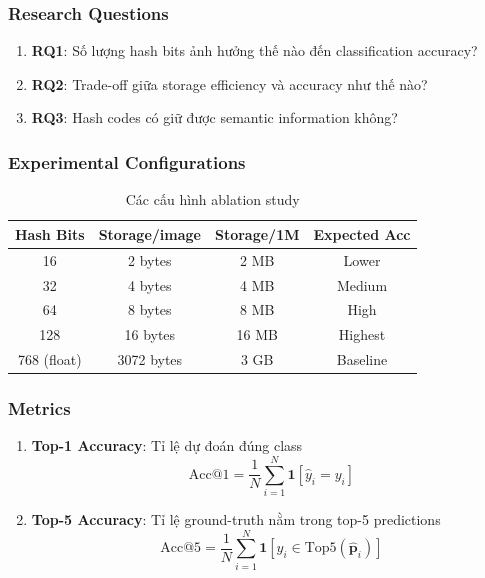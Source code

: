 \documentclass[12pt,a4paper]{article}
\begin{document}
\subsubsection{Research Questions}

\begin{enumerate}
    \item \textbf{RQ1}: Số lượng hash bits ảnh hưởng thế nào đến classification accuracy?
    \item \textbf{RQ2}: Trade-off giữa storage efficiency và accuracy như thế nào?
    \item \textbf{RQ3}: Hash codes có giữ được semantic information không?
\end{enumerate}

\subsubsection{Experimental Configurations}

\begin{table}[H]
\centering
\caption{Các cấu hình ablation study}
\begin{tabular}{c|ccc}
\toprule
\textbf{Hash Bits} & \textbf{Storage/image} & \textbf{Storage/1M} & \textbf{Expected Acc} \\
\midrule
16 & 2 bytes & 2 MB & Lower \\
32 & 4 bytes & 4 MB & Medium \\
64 & 8 bytes & 8 MB & High \\
128 & 16 bytes & 16 MB & Highest \\
\midrule
768 (float) & 3072 bytes & 3 GB & Baseline \\
\bottomrule
\end{tabular}
\end{table}

\subsubsection{Metrics}

\begin{enumerate}
    \item \textbf{Top-1 Accuracy}: Tỉ lệ dự đoán đúng class
    \begin{equation}
        \text{Acc@1} = \frac{1}{N}\sum_{i=1}^N \mathbf{1}[\hat{y}_i = y_i]
    \end{equation}
    
    \item \textbf{Top-5 Accuracy}: Tỉ lệ ground-truth nằm trong top-5 predictions
    \begin{equation}
        \text{Acc@5} = \frac{1}{N}\sum_{i=1}^N \mathbf{1}[y_i \in \text{Top5}(\hat{\mathbf{p}}_i)]
    \end{equation}
\end{enumerate}
\end{document}
